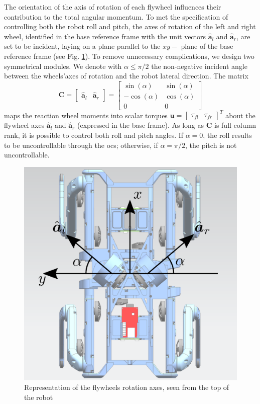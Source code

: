 \documentclass[journal,letterpaper]{IEEEtran}
\begin{document}
The orientation of the axis of rotation of each flywheel influences their contribution to the total angular momentum. To met the specification of controlling both the robot roll and pitch, the axes of rotation of the left and right wheel, identified in the base reference frame with the unit vectors $\hat{\bm{a}}_l$ and $\hat{\bm{a}}_r$, are set to be incident, laying on a plane parallel to the $xy-$ plane of the base reference frame (see Fig. \ref{fig:angVel}). 
To remove unnecessary complications, we design two symmetrical modules. We denote with $\alpha \leq \pi/2$ the non-negative incident angle between the wheels'axes of rotation and the robot lateral direction. The matrix 
\begin{equation}
\bm{C} = 
\left[ \begin{array}{cc}
\hat{\bm{a}}_l & \hat{\bm{a}}_r
\end{array} \right] = 
\left[ \begin{array}{cc}
\sin(\alpha) & \sin(\alpha) \\
-\cos(\alpha) & \cos(\alpha) \\
0 & 0
\end{array} \right]
\end{equation}
maps the reaction wheel moments into scalar torques $\bm{u} = \left[\begin{array}{cc} \tau_{fl} & \tau_{fr} \end{array} \right]^T$ about the flywheel axes $\hat{\bm{a}}_l$ and $\hat{\bm{a}}_r$ (expressed in the base frame).
As long as $\bm{C}$ is full column rank, it is possible to control both roll and pitch angles. If $\alpha = 0$, the roll results to be uncontrollable through the \acrshort{ocs}; otherwise, if $\alpha = \pi/2$, the pitch is not uncontrollable. 
\begin{figure}
	\centering
	\includegraphics[width=0.7\linewidth]{figures/angular_velocities.eps}
	\caption{Representation of the flywheels rotation axes, seen from the top of the robot}
	\label{fig:angVel}
\end{figure}
\end{document}

